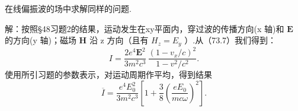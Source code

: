 \begin{xiti}
\quad 在线偏振波的场中求解同样的问题.

解：按照§48习题2的结果，运动发生在xy平面内，穿过波的传播方向(x 轴)和 $\boldsymbol{E}$ 的方向(y 轴)；磁场 $\boldsymbol{H}$ 沿 z 方向（且有 $H_z=E_y$ ）.从（73.7）我们得到：
\begin{equation*}
  I=\frac{2e^4\boldsymbol{E}^2}{3m^2c^3}\,\frac{(1-v_x/c)^2}{1-v^2/c^2}.
\end{equation*}
使用所引习题的参数表示，对运动周期作平均，得到结果
\begin{equation*}
  \overline{I}=\frac{e^4E_0^2}{3m^2c^3}\left[1+\frac{3}{8}\left(\frac{eE_0}{mc\omega}\right)^2\right].
\end{equation*}

\end{xiti}

%
